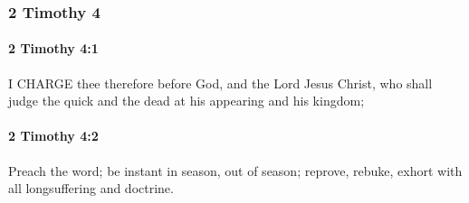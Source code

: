 	\subsubsection{2 Timothy 4} %
		\label{2TIMOTHY-4}
		
		\paragraph{2 Timothy 4:1} %
			\label{2TIMOTHY-4-1}

			I CHARGE thee therefore before God, and the Lord Jesus Christ, who shall judge the quick and the dead at his appearing and his kingdom;

			\begin{framed}
			\scriptsize
				\begin{compactdesc}
					\item[SBLG] 
				\end{compactdesc}
			\end{framed}

		\paragraph{2 Timothy 4:2} %
			\label{2TIMOTHY-4-2}

			Preach the word; be instant in season, out of season; reprove, rebuke, exhort with all longsuffering and doctrine.

